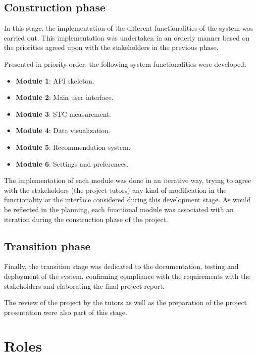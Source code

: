 \subsection{Construction phase}
\label{sec:constructionPhase}

In this stage, the implementation of the different functionalities of the system was carried out. This implementation was undertaken in an orderly manner based on the priorities agreed upon with the stakeholders in the previous phase.

Presented in priority order, the following system functionalities were developed:

\begin{itemize}
\item \textbf{Module 1}: API skeleton. 
\item \textbf{Module 2}: Main user interface.
\item \textbf{Module 3}: STC measurement.
\item \textbf{Module 4}: Data visualization.
\item \textbf{Module 5}: Recommendation system.
\item \textbf{Module 6}: Settings and preferences.
\end{itemize}

The implementation of each module was done in an iterative way, trying to agree with the stakeholders (the project tutors) any kind of modification in the functionality or the interface considered during this development stage. As would be reflected in the planning, each functional module was associated with an iteration during the construction phase of the project.

\subsection{Transition phase}
\label{sec:transitionPhase}

Finally, the transition stage was dedicated to the documentation, testing and deployment of the system, confirming compliance with the requirements with the stakeholders and elaborating the final project report.

The review of the project by the tutors as well as the preparation of the project presentation were also part of this stage.

\section{Roles}
\label{sec:roles}

